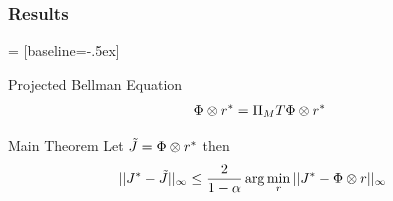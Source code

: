 \documentclass[10pt]{beamer}
\begin{document}
\begin{frame}
\frametitle{Results}
 = [baseline=-.5ex]

\begin{block}{Projected Bellman Equation}
\begin{align*}
\Phi \otimes r^*=\Pi_M T \Phi \otimes r^*
\end{align*}
\end{block}
\vspace{-10pt}

\begin{block}{Main Theorem}
Let $\tilde{J}=\Phi \otimes r^*$ then
\begin{align*}
||J^*-\tilde{J}||_\infty&\leq \frac{2}{1-\alpha}\arg\min_r||J^*-\Phi\otimes r||_\infty
\end{align*}
\end{block}

\end{frame}
\end{document}
